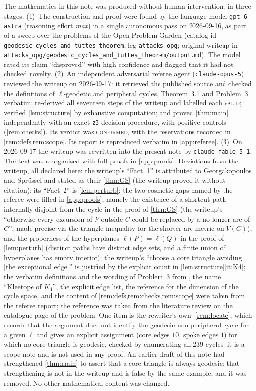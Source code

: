 \documentclass[11pt,a4paper]{article}
\theoremstyle{plain}
\theoremstyle{definition}
\theoremstyle{remark}
\begin{document}
The mathematics in this note was produced without human intervention, in three stages.
(1)~The construction and proof were found by the language model \texttt{gpt-6-astra} (reasoning effort \emph{max}) in a single autonomous pass on 2026-09-16, as part of a sweep over the problems of the Open Problem Garden (catalog id \texttt{geodesic\_cycles\_and\_tuttes\_theorem}, leg \texttt{attacks\_opg}; original writeup in \texttt{attacks\_opg/geodesic\_cycles\_and\_tuttes\_theorem/output.md}). The model rated its claim ``disproved'' with high confidence and flagged that it had not checked novelty.
(2)~An independent adversarial referee agent (\texttt{claude-opus-5}) reviewed the writeup on 2026-09-17: it retrieved the published source \cite{GS09} and checked the definitions of $\ell$-geodetic and peripheral cycles, Theorem~3.1 and Problem~3 verbatim; re-derived all seventeen steps of the writeup and labelled each \textsc{valid}; verified \cref{lem:structure} by exhaustive computation; and proved \cref{thm:main} independently with an exact \texttt{z3} decision procedure, with positive controls (\cref{rem:checks}). Its verdict was \textsc{confirmed}, with the reservations recorded in \cref{rem:defs,rem:scope}. Its report is reproduced verbatim in \cref{app:referee}.
(3)~On 2026-09-17 the writeup was rewritten into the present note by \texttt{claude-fable-5-1}. The text was reorganised with full proofs in \cref{app:proofs}. Deviations from the writeup, all declared here: the writeup's ``Fact~1'' is attributed to Georgakopoulos and Sprüssel and stated as their \cref{thm:GS} (the writeup proved it without citation); its ``Fact~2'' is \cref{lem:perturb}; the two cosmetic gaps named by the referee were filled in \cref{app:proofs}, namely the existence of a shortcut path internally disjoint from the cycle in the proof of \cref{thm:GS} (the writeup's ``otherwise every excursion of $P$ outside $C$ could be replaced by a no-longer arc of $C$'', made precise via the triangle inequality for the shorter-arc metric on $V(C)$), and the properness of the hyperplanes $\ell(P)=\ell(Q)$ in the proof of \cref{lem:perturb} (distinct paths have distinct edge sets, and a finite union of hyperplanes has empty interior); the writeup's ``choose a core triangle avoiding [the exceptional edge]'' is justified by the explicit count in \cref{lem:structure}\ref{it:K4}; the verbatim definitions and the wording of Problem~3 from \cite{GS09}, the name ``Kleetope of $K_4$'', the explicit edge list, the reference \cite{Diestel} for the dimension of the cycle space, and the content of \cref{rem:defs,rem:checks,rem:scope} were taken from the referee report; the reference \cite{Hamann14} was taken from the literature review on the catalogue page of the problem. One item is the rewriter's own: \cref{rem:locate}, which records that the argument does not identify the geodesic non-peripheral cycle for a given $\ell$ and gives an explicit assignment (core edges $10$, spoke edges $1$) for which no core triangle is geodesic, checked by enumerating all $239$ cycles; it is a scope note and is not used in any proof. An earlier draft of this note had strengthened \cref{thm:main} to assert that a core triangle is always geodesic; that strengthening is not in the writeup and is false by the same example, and it was removed. No other mathematical content was changed.
\end{document}
